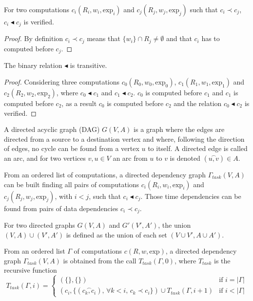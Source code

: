 \begin{myprop}
For two computations $c_i(R_i,w_i,\text{exp}_i)$ and $c_j(R_j,w_j,\text{exp}_j)$ such that $c_i \prec c_j$, $c_i \blacktriangleleft c_j$ is verified.
\end{myprop}

\begin{proof}
By definition $c_i \prec c_j$ means that $\{w_i\}\cap R_j \neq \emptyset$ and that $c_i$ has to computed before $c_j$. %
\end{proof}

\begin{myprop}
The binary relation $\blacktriangleleft$ is transitive. 
\end{myprop}

\begin{proof}
Considering three computations $c_0(R_0,w_0,\text{exp}_0)$, $c_1(R_1,w_1,\text{exp}_1)$ and $c_2(R_2,w_2,\text{exp}_2)$, where $c_0 \blacktriangleleft c_1$ and $c_1 \blacktriangleleft c_2$. $c_0$ is computed before $c_1$ and $c_1$ is computed before $c_2$, as a result $c_0$ is computed before $c_2$ and the relation $c_0 \blacktriangleleft c_2$ is verified. 
\end{proof}

\begin{mydef}
A directed acyclic graph (DAG) $G(V,A)$ is a graph where the edges are directed from a source to a destination vertex and where, following the direction of edges, no cycle can be found from a vertex $u$ to itself. A directed edge is called an arc, and for two vertices $v,u \in V$ an arc from $u$ to $v$ is denoted $(\overset{\frown}{u,v}) \in A$.
\end{mydef}

From an ordered list of computations, a directed dependency graph $\Gamma_{task}(V,A)$ can be built finding all pairs of computations $c_i(R_i,w_i,\text{exp}_i)$ and $c_j(R_j,w_j,\text{exp}_j)$, with $i<j$, such that $c_i \blacktriangleleft c_j$. Those time dependencies can be found from pairs of data dependencies $c_i \prec c_j$.

\begin{mydef}
For two directed graphs $G(V,A)$ and $G'(V',A')$, the union $(V,A)\cup (V',A')$ is defined as the union of each set $(V\cup V', A \cup A')$.
\end{mydef}

\begin{mydef}
From an ordered list $\Gamma$ of computations $c(R,w,\text{exp})$, a directed dependency graph $\Gamma_{task}(V,A)$ is obtained from the call $T_{task}(\Gamma,0)$, where $T_{task}$ is the recursive function
\begin{equation*}
T_{task}(\Gamma,i) = 
\begin{cases} 	(\{\},\{\}) & \mbox{if }i=|\Gamma|\\
				(c_i, \{(\overset{\frown}{c_k,c_i})\mbox{, }\forall k < i \mbox{, } c_k\prec c_i \})\cup T_{task}(\Gamma,i+1) & \mbox{if }i<|\Gamma|
\end{cases}
\end{equation*}
\end{mydef}

